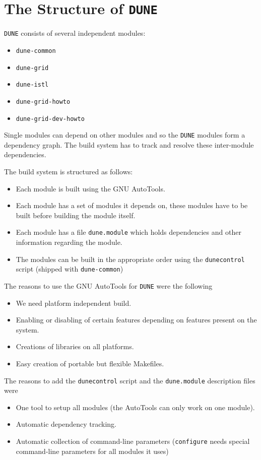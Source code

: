 \documentclass[11pt,a4paper,headinclude,footinclude,DIV16,normalheadings]{scrartcl}
\newcommand{\dune}{\texttt{DUNE}\xspace}
\newcommand{\configure}{\texttt{configure}\xspace}
\newcommand{\dunecommon}{\texttt{dune-common}\xspace}
\newcommand{\duneistl}{\texttt{dune-istl}\xspace}
\newcommand{\dunegrid}{\texttt{dune-grid}\xspace}
\newcommand{\dunegridhowto}{\texttt{dune-grid-howto}\xspace}
\newcommand{\dunegriddevhowto}{\texttt{dune-grid-dev-howto}\xspace}
\newcommand{\dunecontrol}{\texttt{dunecontrol}\xspace}
\newcommand{\dunemodule}{\texttt{dune.module}\xspace}
\begin{document}
\section{The Structure of \dune}
\dune consists of several independent modules:
\begin{itemize}
\item \dunecommon
\item \dunegrid
\item \duneistl
\item \dunegridhowto
\item \dunegriddevhowto
\end{itemize}

Single modules can depend on other modules and so the \dune modules
form a dependency graph.  The build system has to track and resolve
these inter-module dependencies.

The build system is structured as follows:
\begin{itemize}
\item Each module is built using the GNU AutoTools.
\item Each module has a set of modules it depends on, these modules
  have to be built before building the module itself.
\item Each module has a file \dunemodule which holds dependencies and
  other information regarding the module.
\item The modules can be built in the appropriate order using the
  \dunecontrol script (shipped with \dunecommon)
\end{itemize}

The reasons to use the GNU AutoTools for \dune were the following
\begin{itemize}
\item We need platform independent build.
\item Enabling or disabling of certain features depending on
  features present on the system.
\item Creations of libraries on all platforms.
\item Easy creation of portable but flexible Makefiles.
\end{itemize}

The reasons to add the \dunecontrol script and the \dunemodule
description files were
\begin{itemize}
\item One tool to setup all modules (the AutoTools can only work on one
  module).
\item Automatic dependency tracking.
\item Automatic collection of command-line parameters (\configure needs
  special command-line parameters for all modules it uses)
\end{itemize}
\end{document}
